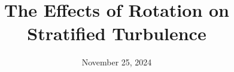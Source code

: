 \documentclass{beamer}
\title{The Effects of Rotation on Stratified Turbulence}
\date{November 25, 2024}
\institute{UCSC Applied Mathematics}
\begin{document}
\newcommand{\wrms}{w_{\text{rms}}}
\newcommand{\bs}[1]{\boldsymbol{#1}}
\newcommand{\tb}[1]{\textbf{#1}}
\newcommand{\bmp}[1]{\begin{minipage}{#1\textwidth}}
\newcommand{\emp}{\end{minipage}}
\newcommand{\R}{\mathbb{R}}
\newcommand{\C}{\mathbb{C}}
\newcommand{\N}{\mathcal{N}}
\newcommand{\K}{\bs{\mathrm{K}}}
\newcommand{\m}{\bs{\mu}_*}
\newcommand{\s}{\bs{\Sigma}_*}
\newcommand{\dt}{\Delta t}
\newcommand{\dx}{\Delta x}
\newcommand{\tr}[1]{\text{Tr}(#1)}
\newcommand{\Tr}[1]{\text{Tr}(#1)}
\newcommand{\Div}{\nabla \cdot}
\renewcommand{\div}{\nabla \cdot}
\newcommand{\Curl}{\nabla \times}
\newcommand{\Grad}{\nabla}
\newcommand{\grad}{\nabla}
\newcommand{\grads}{\nabla_s}
\newcommand{\gradf}{\nabla_f}
\newcommand{\xs}{\bs{x}_s}
\newcommand{\xf}{\bs{x}_f}
\newcommand{\ts}{t_s}
\newcommand{\tf}{t_f}
\newcommand{\pt}{\partial t}
\newcommand{\pz}{\partial z}
\newcommand{\uvec}{\bs{u}}
\newcommand{\F}{\bs{F}}
\newcommand{\T}{\tilde{T}}
\newcommand{\ez}{\bs{e}_z}
\newcommand{\ex}{\bs{e}_x}
\newcommand{\ey}{\bs{e}_y}
\newcommand{\eo}{\bs{e}_{\bs{\Omega}}}
\newcommand{\ppt}[1]{\frac{\partial #1}{\partial t}}
\newcommand{\ppts}[1]{\frac{\partial #1}{\partial t_s}}
\newcommand{\pptf}[1]{\frac{\partial #1}{\partial t_f}}
\newcommand{\ppz}[1]{\frac{\partial #1}{\partial z}}
\newcommand{\ddz}[1]{\frac{d #1}{d z}}
\newcommand{\ppzetas}[1]{\frac{\partial^2 #1}{\partial \zeta^2}}
\newcommand{\ppzs}[1]{\frac{\partial #1}{\partial z_s}}
\newcommand{\ppzf}[1]{\frac{\partial #1}{\partial z_f}}
\newcommand{\ppx}[1]{\frac{\partial #1}{\partial x}}
\newcommand{\ppy}[1]{\frac{\partial #1}{\partial y}}
\newcommand{\ppzeta}[1]{\frac{\partial #1}{\partial \zeta}}

\frame{\titlepage}
\end{document}

